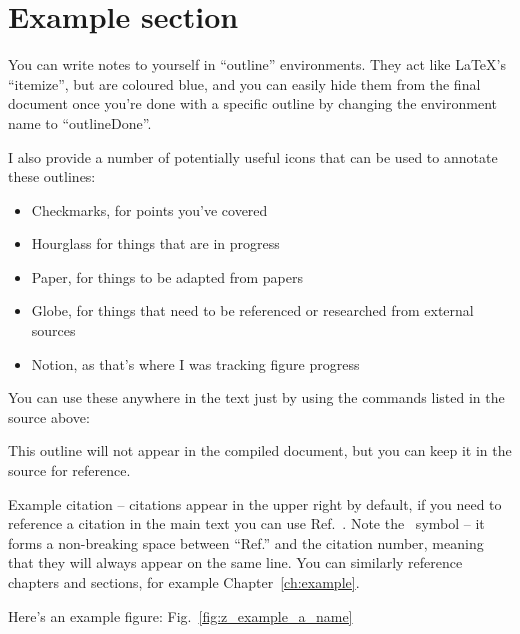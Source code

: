 \section{Example section}
\label{sec:example_section}
\begin{outline}
	\item You can write notes to yourself in ``outline'' environments. They act like LaTeX's ``itemize'', but are coloured blue, and you can easily hide them from the final document once you're done with a specific outline by changing the environment name to ``outlineDone''.
	\item I also provide a number of potentially useful icons that can be used to annotate these outlines:
	\begin{itemize}
		\item Checkmarks, for points you've covered \checkmark
		\item Hourglass for things that are in progress \progress
		\item Paper, for things to be adapted from papers \paper
		\item Globe, for things that need to be referenced or researched from external sources \globe
		\item Notion, as that's where I was tracking figure progress \notion
	\end{itemize}
	\item You can use these anywhere in the text just by using the commands listed in the source above: \checkmark\paper
\end{outline}

\begin{outlineDone}
	\item This outline will not appear in the compiled document, but you can keep it in the source for reference.
\end{outlineDone}

Example citation\cite{dranczewskiPlasmaEtchingFabrication2023} -- citations appear in the upper right by default, if you need to reference a citation in the main text you can use Ref.~. Note the \goodtilde~symbol -- it forms a non-breaking space between ``Ref.'' and the citation number, meaning that they will always appear on the same line. You can similarly reference chapters and sections, for example Chapter~\ref{ch:example}.

Here's an example figure: Fig.~\ref{fig:z_example_a_name}

